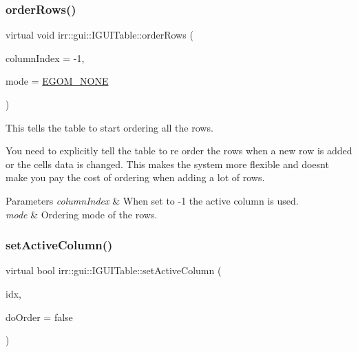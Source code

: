 \subsubsection{\texorpdfstring{order\+Rows()}{orderRows()}\hspace{0.1cm}{\footnotesize\ttfamily [2/2]}}
{\footnotesize\ttfamily virtual void irr\+::gui\+::\+I\+G\+U\+I\+Table\+::order\+Rows (\begin{DoxyParamCaption}\item[{\hyperlink{namespaceirr_ac66849b7a6ed16e30ebede579f9b47c6}{s32}}]{column\+Index = {\ttfamily -\/1},  }\item[{\hyperlink{namespaceirr_1_1gui_a577bf3aa30c2e3bde9aa3eaa2e4f16d3}{E\+G\+U\+I\+\_\+\+O\+R\+D\+E\+R\+I\+N\+G\+\_\+\+M\+O\+DE}}]{mode = {\ttfamily \hyperlink{namespaceirr_1_1gui_a577bf3aa30c2e3bde9aa3eaa2e4f16d3afc9617a9d7600ff2bea753c6fe060ad0}{E\+G\+O\+M\+\_\+\+N\+O\+NE}} }\end{DoxyParamCaption})\hspace{0.3cm}{\ttfamily [pure virtual]}}



This tells the table to start ordering all the rows. 

You need to explicitly tell the table to re order the rows when a new row is added or the cells data is changed. This makes the system more flexible and doesn\textquotesingle{}t make you pay the cost of ordering when adding a lot of rows. 
\begin{DoxyParams}{Parameters}
{\em column\+Index} & When set to -\/1 the active column is used. \\
\hline
{\em mode} & Ordering mode of the rows. \\
\hline
\end{DoxyParams}
\mbox{\label{classirr_1_1gui_1_1IGUITable_ae4882275e6695855c0f3ca55e20f554e}} 
\subsubsection{\texorpdfstring{set\+Active\+Column()}{setActiveColumn()}\hspace{0.1cm}{\footnotesize\ttfamily [1/2]}}
{\footnotesize\ttfamily virtual bool irr\+::gui\+::\+I\+G\+U\+I\+Table\+::set\+Active\+Column (\begin{DoxyParamCaption}\item[{\hyperlink{namespaceirr_ac66849b7a6ed16e30ebede579f9b47c6}{s32}}]{idx,  }\item[{bool}]{do\+Order = {\ttfamily false} }\end{DoxyParamCaption})\hspace{0.3cm}{\ttfamily [pure virtual]}}



